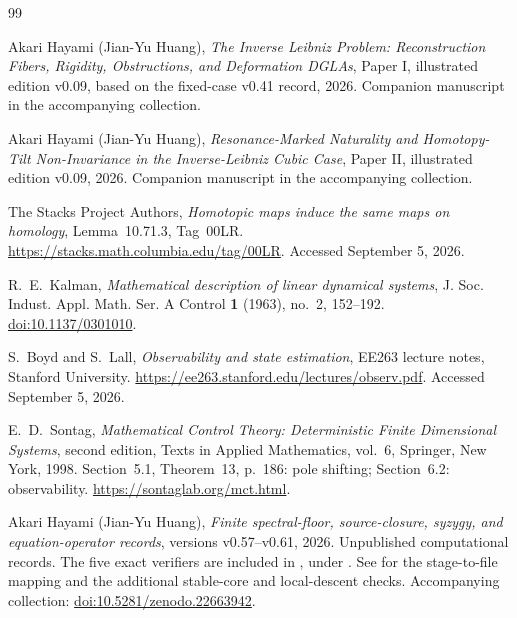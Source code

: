 \documentclass[11pt]{amsart}
\theoremstyle{definition}
\begin{document}
\begin{thebibliography}{99}
\raggedright

Akari Hayami (Jian-Yu Huang),
\emph{The Inverse Leibniz Problem: Reconstruction Fibers, Rigidity, Obstructions, and Deformation DGLAs},
Paper I, illustrated edition v0.09, based on the fixed-case v0.41 record, 2026.
Companion manuscript in the accompanying collection.

Akari Hayami (Jian-Yu Huang),
\emph{Resonance-Marked Naturality and Homotopy-Tilt Non-Invariance in the Inverse-Leibniz Cubic Case},
Paper II, illustrated edition v0.09, 2026. Companion manuscript in the accompanying collection.


The Stacks Project Authors,
\emph{Homotopic maps induce the same maps on homology},
Lemma~10.71.3, Tag~00LR.
\url{https://stacks.math.columbia.edu/tag/00LR}. Accessed September 5, 2026.

R.~E.~Kalman,
\emph{Mathematical description of linear dynamical systems},
J. Soc. Indust. Appl. Math. Ser. A Control \textbf{1} (1963), no.~2, 152--192.
\href{https://doi.org/10.1137/0301010}{doi:10.1137/0301010}.

S.~Boyd and S.~Lall,
\emph{Observability and state estimation},
EE263 lecture notes, Stanford University.
\url{https://ee263.stanford.edu/lectures/observ.pdf}. Accessed September 5, 2026.

E.~D.~Sontag,
\emph{Mathematical Control Theory: Deterministic Finite Dimensional Systems},
second edition, Texts in Applied Mathematics, vol.~6, Springer, New York, 1998.
Section~5.1, Theorem~13, p.~186: pole shifting; Section~6.2: observability.
\url{https://sontaglab.org/mct.html}.

Akari Hayami (Jian-Yu Huang),
\emph{Finite spectral-floor, source-closure, syzygy, and equation-operator records},
versions v0.57--v0.61, 2026. Unpublished computational records.
The five exact verifiers are included in
, under
.
See  for the stage-to-file mapping and the
additional stable-core and local-descent checks. Accompanying collection: \href{https://doi.org/10.5281/zenodo.22663942}{doi:10.5281/zenodo.22663942}.
\end{thebibliography}
\end{document}
